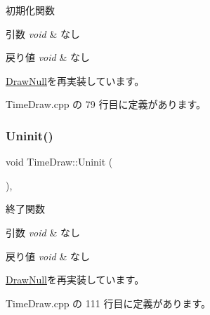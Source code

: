 初期化関数 


\begin{DoxyParams}{引数}
{\em void} & なし \\
\hline
\end{DoxyParams}

\begin{DoxyRetVals}{戻り値}
{\em void} & なし \\
\hline
\end{DoxyRetVals}


\mbox{\hyperlink{class_draw_null_a20aef1e54c1a158b741bfd731e18efdf}{Draw\+Null}}を再実装しています。



 Time\+Draw.\+cpp の 79 行目に定義があります。

\mbox{\label{class_time_draw_abcfea17acdc56d251e680e926da001fc}} 
\subsubsection{\texorpdfstring{Uninit()}{Uninit()}}
{\footnotesize\ttfamily void Time\+Draw\+::\+Uninit (\begin{DoxyParamCaption}{ }\end{DoxyParamCaption})\hspace{0.3cm}{\ttfamily [override]}, {\ttfamily [virtual]}}



終了関数 


\begin{DoxyParams}{引数}
{\em void} & なし \\
\hline
\end{DoxyParams}

\begin{DoxyRetVals}{戻り値}
{\em void} & なし \\
\hline
\end{DoxyRetVals}


\mbox{\hyperlink{class_draw_null_a6e81d63efab7333e8d0e8af99362a4d9}{Draw\+Null}}を再実装しています。



 Time\+Draw.\+cpp の 111 行目に定義があります。

\mbox{\label{class_time_draw_a2471360fb021ce38bec34dbe6f171b9f}} 
